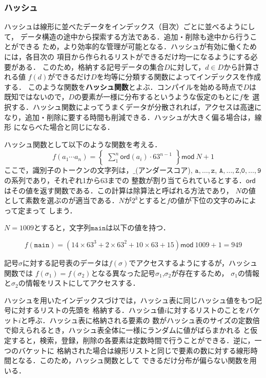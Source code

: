 \documentclass[a4j,dvipdfmx]{jbook}
\begin{document}
\subsubsection{ハッシュ}

ハッシュは線形に並べたデータをインデックス（目次）ごとに並べるようにして，
データ構造の途中から探索する方法である．追加・削除も途中から行うことができる
ため，より効率的な管理が可能となる．ハッシュが有効に働くためには，各目次の
項目から作られるリストができるだけ均一になるようにする必要がある．
このため，格納する記号データの集合$D$に対して，$d\in D$から計算される値
$f(d)$ができるだけ$D$を均等に分類する関数によってインデックスを作成する．
このような関数を{\bf ハッシュ関数}とよぶ．コンパイルを始める時点で$D$は
既知ではないので，$D$の要素が一様に分布するというような仮定のもとに$f$を
選択する．ハッシュ関数によってうまくデータが分散されれば，アクセスは高速に
なり，追加・削除に要する時間も削減できる．ハッシュが大きく偏る場合は，線形
にならべた場合と同じになる．

ハッシュ関数として以下のような関数を考える．
\[
    f(a_1\cdots a_n)=\left\{\begin{array}{l}
        \sum^n_1\mathsf{ord}(a_i)\cdot 63^{n-1}
    \end{array}\right\}\mathsf{mod}\ N+1
\]
ここで，識別子のトークンの文字列は，$\texttt{\_}$(アンダースコア), $\texttt{a},\ldots,\texttt{z}$,
$\texttt{A},\ldots,\texttt{Z}$,$\texttt{0},\ldots,\texttt{9}$の系列であり，それぞれ1から63までの
整数が割り当てられているとする．$\mathsf{ord}$はその値を返す関数である．この計算は除算法と呼ばれる方法であり，
$N$の値として素数を選ぶのが適当である．$N$が$2^k$とすると$f$の値が下位の文字のみによって定まって
しまう．

$N=1009$とすると，文字列$\texttt{main}$は以下の値を持つ．

\[f(\texttt{main})=(14\times 63^3+2\times 63^2+10\times 63+15)\mathsf{mod}\ 1009+1=949\]

記号$\sigma$に対する記号表のデータは$f(\sigma)$でアクセスするようにするが，ハッシュ関数では
$f(\sigma_1)=f(\sigma_2)$となる異なった記号$\sigma_1$,$\sigma_2$が存在するため，
$\sigma_1$の情報と$\sigma_2$の情報をリストにしてアクセスする．

ハッシュを用いたインデックスづけでは，ハッシュ表に同じハッシュ値をもつ記号に対するリストの先頭を
格納する．ハッシュ値$i$に対するリストのことをバケット$i$と呼ぶ．ハッシュ表に格納される要素の
数がハッシュ表のサイズの定数倍で抑えられるとき，ハッシュ表全体に一様にランダムに値がばらまかれる
と仮定すると，検索，登録，削除の各要素は定数時間で行うことができる．逆に，一つのバケットに
格納された場合は線形リストと同じで要素の数に対する線形時間となる．このため，ハッシュ関数として
できるだけ分布が偏らない関数を用いる．
\end{document}
